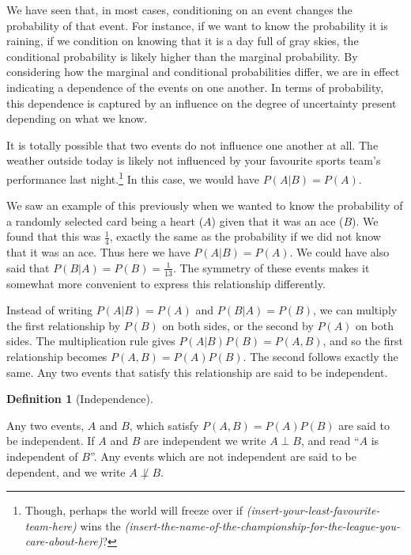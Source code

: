 \documentclass[
  letterpaper,
  DIV=11,
  numbers=noendperiod]{scrreprt}
\theoremstyle{definition}
\theoremstyle{definition}
\theoremstyle{definition}
\newtheorem{definition}{Definition}[chapter]
\theoremstyle{remark}
\begin{document}
We have seen that, in most cases, conditioning on an event changes the
probability of that event. For instance, if we want to know the
probability it is raining, if we condition on knowing that it is a day
full of gray skies, the conditional probability is likely higher than
the marginal probability. By considering how the marginal and
conditional probabilities differ, we are in effect indicating a
dependence of the events on one another. In terms of probability, this
dependence is captured by an influence on the degree of uncertainty
present depending on what we know.

It is totally possible that two events do not influence one another at
all. The weather outside today is likely not influenced by your
favourite sports team's performance last night.\footnote{Though, perhaps
  the world will freeze over if
  \emph{(insert-your-least-favourite-team-here)} wins the
  \emph{(insert-the-name-of-the-championship-for-the-league-you-care-about-here)}?}
In this case, we would have \(P(A|B) = P(A)\).

We saw an example of this previously when we wanted to know the
probability of a randomly selected card being a heart (\(A\)) given that
it was an ace (\(B\)). We found that this was \(\frac{1}{4}\), exactly
the same as the probability if we did not know that it was an ace. Thus
here we have \(P(A|B)=P(A)\). We could have also said that
\(P(B|A)=P(B)=\frac{1}{13}\). The symmetry of these events makes it
somewhat more convenient to express this relationship differently.

Instead of writing \(P(A|B) = P(A)\) and \(P(B|A) = P(B)\), we can
multiply the first relationship by \(P(B)\) on both sides, or the second
by \(P(A)\) on both sides. The multiplication rule gives
\(P(A|B)P(B) = P(A,B)\), and so the first relationship becomes
\(P(A,B) = P(A)P(B)\). The second follows exactly the same. Any two
events that satisfy this relationship are said to be independent.

\begin{definition}[Independence]\protect\hypertarget{def-independence}{}\label{def-independence}

Any two events, \(A\) and \(B\), which satisfy \(P(A,B) = P(A)P(B)\) are
said to be independent. If \(A\) and \(B\) are independent we write
\(A\perp B\), and read ``\(A\) is independent of \(B\)''. Any events
which are not independent are said to be dependent, and we write
\(A\not\perp B\).

\end{definition}
\end{document}
